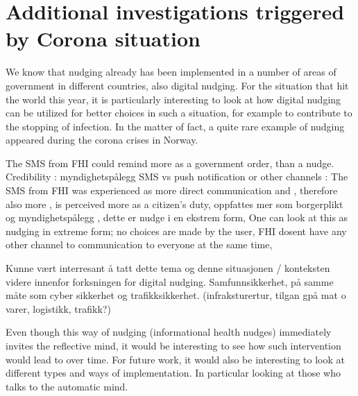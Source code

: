 \section{Additional investigations triggered by Corona situation}
We know that nudging already has been implemented in a number of areas of government in different countries, also digital nudging. For the situation that hit the world this year, it is particularly interesting to look at how digital nudging can be utilized for better choices in such a situation, for example to contribute to the stopping of infection. In the matter of fact, a quite rare example of nudging appeared during the corona crises in Norway.  

The SMS from FHI could remind more as a government order, than a nudge. 
Credibility : myndighetspålegg 
SMS vs push notification or other channels : The SMS from FHI was experienced as more direct communication and , therefore also more , is perceived more as a citizen's duty, oppfattes mer som borgerplikt og myndighetspålegg , dette er nudge i en ekstrem form, 
One can look at this as nudging in extreme form; no choices are made by the user,
FHI dosent have any other channel to communication to everyone at the same time, 

Kunne vært interresant å tatt dette tema og denne situasjonen / konteksten videre innenfor forksningen for digital nudging. Samfunnsikkerhet, på samme måte som cyber sikkerhet og trafikksikkerhet. (infraksturertur, tilgan gpå mat o varer, logistikk, trafikk?)

Even though this way of nudging (informational health nudges) immediately invites the reflective mind, it would be interesting to see how such intervention would lead to over time.  For future work, it would also be interesting to look at different types and ways of implementation. In particular looking at those who talks to the automatic mind. 



